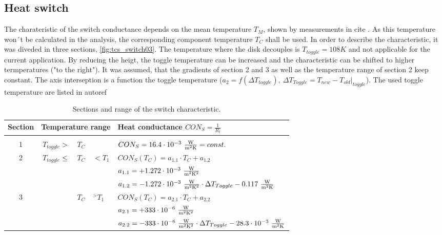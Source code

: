 \subsection{Heat switch} \label{sec:app_therm_3}
The charateristic of the switch conductance depends on the mean temperature $T_M$, shown by measurements in cite .
As this temperature won´t be calculated in the analysis, the corresponding component temperature $T_C$ shall be used.
In order to describe the characteristic, it was diveded in three sections, \autoref{fig:tcs_switch03}.
The temperature where the disk decouples is $T_{toggle}=108 K$ and not applicable for the current application.
By reducing the heigt, the toggle temperature can be increased and the characteristic can be shifted to higher termperatures ("to the right").
It was assumed, that the gradients of section 2 and 3 as well as the temperature range of section 2 keep constant.
The axis interseption is a function the toggle temperature ($a_2=f(\Delta T_{toggle}),\ \Delta T_{Toggle}=T_{new}-T_{old}|_{toggle}$).
The used toggle temperature are listed in autoref
\begin{table}[H]
	\centering
	\caption{Sections and range of the switch characteristic.}
	\begin{tabular}{c@{\qquad}rcl@{\qquad}l}
		\hline
		Section & \multicolumn{3}{l}{Temperature range} & Heat conductance $CON_S= \frac{1}{R_t}$ \\ \hline
		& & & &  \\[-0.5em]
		1 & $T_{toggle} >$ & $ T_C  $ & & $CON_{S}= 16.4 \cdot 10^{-3}\ \frac{{\rm W}}{{\rm m}^2 {\rm K}} = const.$\\[1.5em]
		2 & $T_{toggle}\leq$ & $ T_C $ & $ < T_1$ & $CON_{S} (T_C) = a_{1.1} \cdot T_C+ a_{1.2}$\\[1em]
		& & & & $a_{1.1}= +1.272\cdot 10^{-3}\ \frac{{\rm W}}{{\rm m}^2 {\rm K}^2}$ \\[1em]
		& & & & $  a_{1.2}= -1.272\cdot 10^{-3}\ \frac{\W}{\m^2 \K^2}\cdot \Delta T_{Toggle}-0.117\ \frac{\W}{\m^2 \K}$  \\[2em]
		3 & & 	$ T_C$ & $^ > T_1$ & $CON_{S}(T_C) = a_{2.1} \cdot T_C+ a_{2.2}$\\[1em]
		& & & & $a_{2.1}=+ 333\cdot 10^{-6}\ \frac{{\rm W}}{{\rm m}^2 {\rm K}^2}$ \\[1em]
		& & & & $  a_{2.2}= -333\cdot 10^{-6}\ \frac{{\rm W}}{{\rm m}^2 {\rm K}^2}\cdot \Delta T_{Toggle}-28.3 \cdot 10^{-3}\ \frac{{\rm W}}{{\rm m}^2 {\rm K}}$  \\[1em] \hline
	\end{tabular}
	\label{tab:tcs_section}
\end{table}

